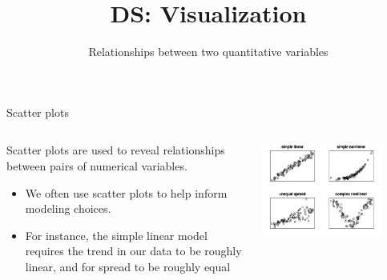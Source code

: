 \documentclass[aspectratio=169]{../latex_main/tntbeamer}  %
\title[Visualization]{DS: Visualization}
\subtitle{Relationships between two quantitative variables}
\begin{document}
	
	\maketitle
	\begin{frame}{Scatter plots}
	    \begin{columns}
            \begin{column}{.4\textwidth}
            
            Scatter plots are used to reveal relationships between pairs of numerical variables.
            \begin{itemize}
                \item We often use scatter plots to help inform modeling choices.
                \item For instance, the simple linear model requires the trend in our data to be roughly linear, and for spread to be roughly equal
            \end{itemize}
            
            \end{column}
            
            \begin{column}{.6\textwidth}
            
                       \includegraphics[width=0.8\textwidth]{Bild45}
                       
            \end{column}
        \end{columns}
	\end{frame}
	
\end{document}

